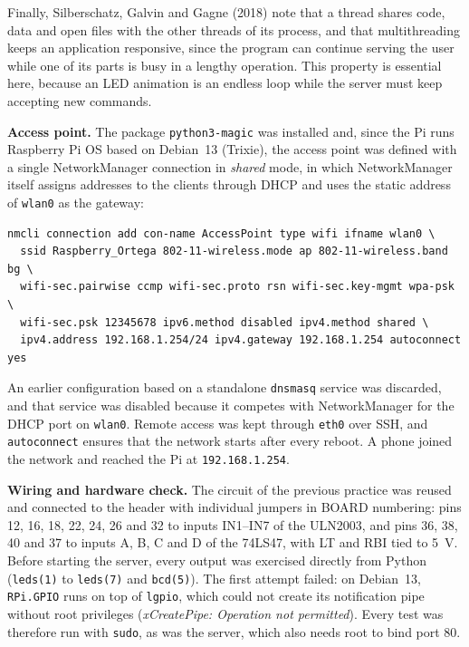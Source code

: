 \documentclass[11pt,letterpaper]{article}
\newcommand{\sect}[1]{\par\medskip\noindent{\large\bfseries #1}\par\smallskip}
\begin{document}
Finally, Silberschatz, Galvin and Gagne (2018) note that a thread shares code, data and open files with the other threads of its process, and that multithreading keeps an application responsive, since the program can continue serving the user while one of its parts is busy in a lengthy operation. This property is essential here, because an LED animation is an endless loop while the server must keep accepting new commands.

\sect{Development}

\textbf{Access point.} The package \texttt{python3-magic} was installed and, since the Pi runs Raspberry Pi OS based on Debian~13 (Trixie), the access point was defined with a single NetworkManager connection in \textit{shared} mode, in which NetworkManager itself assigns addresses to the clients through DHCP and uses the static address of \texttt{wlan0} as the gateway:

\begin{lstlisting}
nmcli connection add con-name AccessPoint type wifi ifname wlan0 \
  ssid Raspberry_Ortega 802-11-wireless.mode ap 802-11-wireless.band bg \
  wifi-sec.pairwise ccmp wifi-sec.proto rsn wifi-sec.key-mgmt wpa-psk \
  wifi-sec.psk 12345678 ipv6.method disabled ipv4.method shared \
  ipv4.address 192.168.1.254/24 ipv4.gateway 192.168.1.254 autoconnect yes
\end{lstlisting}

An earlier configuration based on a standalone \texttt{dnsmasq} service was discarded, and that service was disabled because it competes with NetworkManager for the DHCP port on \texttt{wlan0}. Remote access was kept through \texttt{eth0} over SSH, and \texttt{autoconnect} ensures that the network starts after every reboot. A phone joined the network and reached the Pi at \texttt{192.168.1.254}.

\textbf{Wiring and hardware check.} The circuit of the previous practice was reused and connected to the header with individual jumpers in BOARD numbering: pins 12, 16, 18, 22, 24, 26 and 32 to inputs IN1--IN7 of the ULN2003, and pins 36, 38, 40 and 37 to inputs A, B, C and D of the 74LS47, with LT and RBI tied to 5~V. Before starting the server, every output was exercised directly from Python (\texttt{leds(1)} to \texttt{leds(7)} and \texttt{bcd(5)}). The first attempt failed: on Debian~13, \texttt{RPi.GPIO} runs on top of \texttt{lgpio}, which could not create its notification pipe without root privileges (\textit{xCreatePipe: Operation not permitted}). Every test was therefore run with \texttt{sudo}, as was the server, which also needs root to bind port 80.
\end{document}
